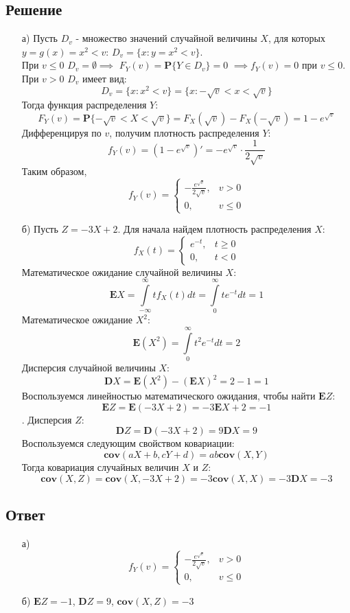 \documentclass[fleqn, 10pt]{article}
\begin{document}
\subsection{Решение}
\begin{itemize}
\item[а)] Пусть \(D_v\) - множество значений случайной величины \(X\), для которых \(y=g(x)=x^2 < v\): \(D_v=\{x : y = x^2 < v\}\). \\
При \(v \leq 0\) \(D_v = \emptyset \implies\) \mbox{\(F_Y(v) =\textbf{P}\{Y\in D_v\} = 0\)} \(\implies f_Y(v) = 0\) при \(v \leq 0\).
При \(v > 0\) \(D_v\) имеет вид:
\[D_v = \{x : x^2 < v\} = \{x : -\sqrt{v} < x < \sqrt{v}\}\]
Тогда функция распределения \(Y\):
\[F_Y(v) = \textbf{P}\{-\sqrt{v} < X < \sqrt{v}\} = F_X(\sqrt{v}) - F_X(-\sqrt{v}) = 1 - e^{\sqrt{v}}\]
Дифференцируя по \(v\), получим плотность распределения \(Y\):
\[f_Y(v) = (1 - e^{\sqrt{v}})' = -e^{\sqrt{v}}\cdot\frac{1}{2\sqrt{v}}\]
Таким образом,
\[f_Y(v) =
\begin{cases}
  -\frac{e^{\sqrt{v}}}{2\sqrt{v}}, & v > 0 \\
  0, & v \leq 0
\end{cases}
\]
\item[б)] Пусть \(Z = -3X + 2\).
  Для начала найдем плотность распределения \(X\):
  \[f_X(t) =
  \begin{cases}
    e^{-t}, & t \geq 0 \\
    0, & t < 0
  \end{cases}
  \]
  Математическое ожидание случайной величины \(X\):
  \[\textbf{E}X = \int\limits_{-\infty}^{\infty}{tf_X(t)dt} = \int\limits_{0}^{\infty}{te^{-t}dt} = 1\]
  Математическое ожидание \(X^2\):
  \[\textbf{E}(X^2) = \int\limits_{0}^{\infty}{t^2e^{-t}dt} = 2\]
  Дисперсия случайной величины \(X\):
  \[\textbf{D}X = \textbf{E}(X^2) - (\textbf{E}X)^2 = 2 - 1 = 1\]
  Воспользуемся линейностью математического ожидания, чтобы найти \(\textbf{E}Z\):
  \[\textbf{E}Z = \textbf{E}(-3X+2) = -3\textbf{E}X + 2 = -1\].
  Дисперсия \(Z\):
  \[\textbf{D}Z = \textbf{D}(-3X+2) = 9\textbf{D}X = 9\]
  Воспользуемся следующим свойством ковариации:
  \[\textbf{cov}(aX+b, cY+d) = ab\textbf{cov}(X,Y)\]
  Тогда ковариация случайных величин \(X\) и \(Z\):
  \[\textbf{cov}(X, Z) = \textbf{cov}(X, -3X+2) = -3\textbf{cov}(X, X) = -3\textbf{D}X = -3\]
  \end{itemize}
\subsection{Ответ}
\begin{itemize}
\item[а)]
  \[f_Y(v) =
\begin{cases}
  -\frac{e^{\sqrt{v}}}{2\sqrt{v}}, & v > 0 \\
  0, & v \leq 0
\end{cases}
\]
\item[б)] \(\textbf{E}Z = -1\), \(\textbf{D}Z = 9\), \(\textbf{cov}(X,Z) = -3\)
\end{itemize}
\end{document}
